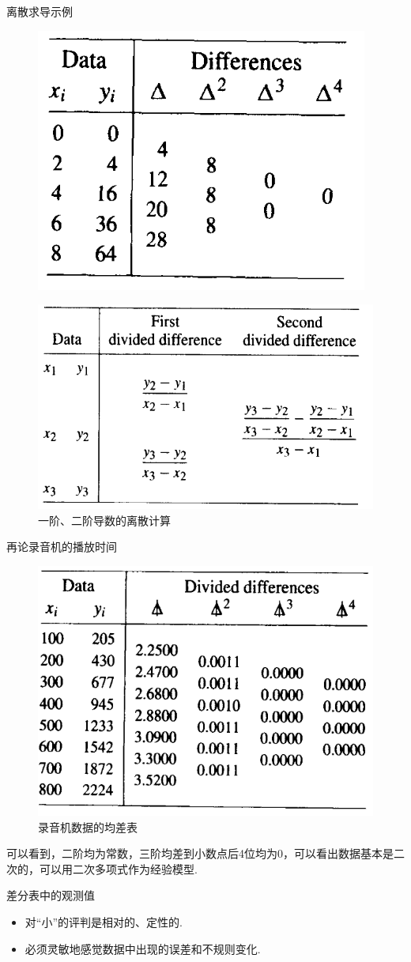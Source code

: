 \documentclass[UTF8]{ctexbeamer}
\begin{document}
\begin{frame}{离散求导示例}
  \begin{figure}
    \includegraphics[width=.3\textwidth{}]{dif-sample.png}
  \end{figure}
  \begin{figure}
    \includegraphics[width=.4\textwidth{}]{dif-tab.png}
    \caption{一阶、二阶导数的离散计算}
  \end{figure}
  
\end{frame}

\begin{frame}{再论录音机的播放时间}
  \begin{figure}
    \includegraphics[width=.5\textwidth{}]{record-dif.png}
    \caption{录音机数据的均差表}
  \end{figure}

  可以看到，二阶均为常数，三阶均差到小数点后4位均为0，可以看出数据基本是二次的，可以用二次多项式作为经验模型.
  
\end{frame}

\begin{frame}{差分表中的观测值}

  \begin{itemize}
  \item 对“小”的评判是相对的、定性的.
  \item 必须灵敏地感觉数据中出现的误差和不规则变化.
  \end{itemize}
  
\end{frame}
\end{document}
